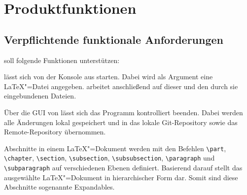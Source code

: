 \section{Produktfunktionen}
\label{sec:produktfunktionen}

\subsection{Verpflichtende funktionale Anforderungen}
\label{subsec:verpflichtende-funktionale-anforderungen}

\texla{} soll folgende Funktionen unterstützen:


\texla{} lässt sich von der Konsole aus starten.
Dabei wird als Argument eine \LaTeX"=Datei angegeben.
\texla{} arbeitet anschließend auf dieser und den durch sie eingebundenen Dateien.


Über die GUI von \texla{} lässt sich das Programm kontrolliert beenden.
Dabei werden alle Änderungen lokal gespeichert und in das lokale Git-Repository sowie das Remote-Repository übernommen.


Abschnitte in einem \LaTeX"=Dokument werden mit den Befehlen \verb|\part|, \verb|\chapter|, \verb|\section|,
\verb|\subsection|, \verb|\subsubsection|, \verb|\paragraph| und \verb|\subparagraph| auf verschiedenen Ebenen
definiert.
Basierend darauf stellt \texla{} das ausgewählte \LaTeX"=Dokument in hierarchischer Form dar.
Somit sind diese Abschnitte sogenannte Expandables.

